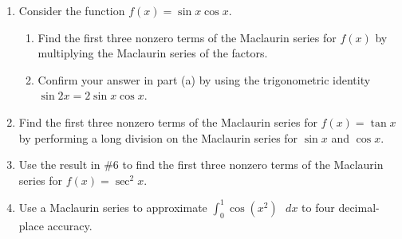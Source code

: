 \documentclass[12pt]{article}
\newif\ifans
\begin{document}
\begin{enumerate}
\item Consider the function $f(x)=\sin{x}\cos{x}$.

\begin{enumerate}

\item Find the first three nonzero terms of the Maclaurin series for $f(x)$ by multiplying the Maclaurin series of the factors.

\ifans{\fbox{$x-\frac{2}{3}x^3+\frac{2}{15}x^5-\ldots$ }} \fi

\item Confirm your answer in part (a) by using the trigonometric identity \\$\sin{2x}=2\sin{x}\cos{x}$.

\ifans{\fbox{\parbox{1\linewidth}{$\sin{x}\cos{x}=\frac{1}{2}\sin{2x}=\frac{1}{2}\left(2x-\frac{(2x)^3}{3!}+\frac{(2x)^5}{5!}-\ldots \right)=x-\frac{2}{3}x^3+\frac{2}{15}x^5-\ldots$ }}} \fi

\end{enumerate}

\item Find the first three nonzero terms of the Maclaurin series for $f(x)=\tan{x}$ by performing a long division on the Maclaurin series for $\sin{x}$ and $\cos{x}$.

\ifans{\fbox{$x+\frac{1}{3}x^3+\frac{2}{15}x^5+\ldots$; Detailed Solution: \textcolor{blue}{\href{http://www.math.drexel.edu/classes/Calculus/resources/Math123HW/Solutions/123_14_Diff_Int_Series_06.pdf}{Here}}}} \fi

\item Use the result in $\#6$ to find the first three nonzero terms of the Maclaurin series for $f(x)=\sec^2{x}$.

\ifans{\fbox{$\sec^2{x}=\frac{d}{dx}(\tan{x})=\frac{d}{dx}{\left[x+\frac{1}{3}x^3+\frac{2}{15}x^5+\ldots \right]}=1+x^2+\frac{2}{3}x^4+\ldots$ }} \fi

\item Use a Maclaurin series to approximate $\int_0^1{\cos(x^2)} \text{ } dx $ to four decimal-place accuracy.


\end{enumerate}
\end{document}
